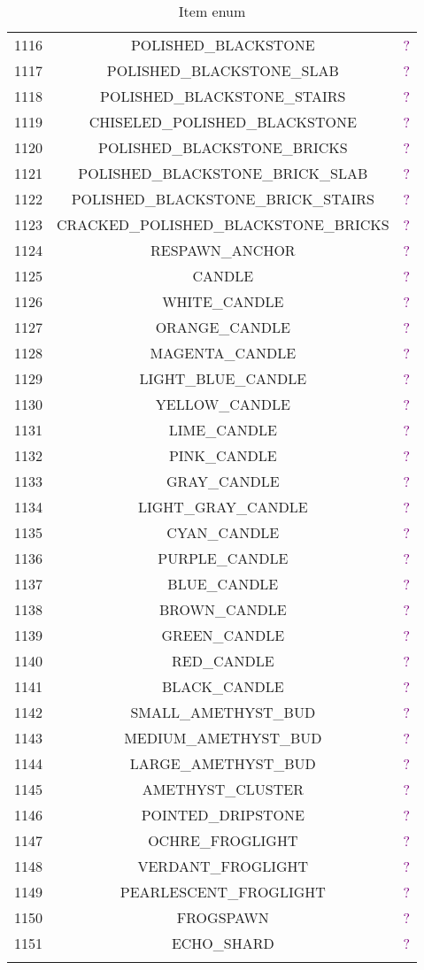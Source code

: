 \documentclass[11pt]{article}
\newcommand\myworries[1]{\textcolor{purple}{#1}}
\begin{document}
\begin{longtable}{ |c|c|c| }
	1116 & POLISHED\_BLACKSTONE & \myworries{?} \\
	1117 & POLISHED\_BLACKSTONE\_SLAB & \myworries{?} \\
	1118 & POLISHED\_BLACKSTONE\_STAIRS & \myworries{?} \\
	1119 & CHISELED\_POLISHED\_BLACKSTONE & \myworries{?} \\
	1120 & POLISHED\_BLACKSTONE\_BRICKS & \myworries{?} \\
	1121 & POLISHED\_BLACKSTONE\_BRICK\_SLAB & \myworries{?} \\
	1122 & POLISHED\_BLACKSTONE\_BRICK\_STAIRS & \myworries{?} \\
	1123 & CRACKED\_POLISHED\_BLACKSTONE\_BRICKS & \myworries{?} \\
	1124 & RESPAWN\_ANCHOR & \myworries{?} \\
	1125 & CANDLE & \myworries{?} \\
	1126 & WHITE\_CANDLE & \myworries{?} \\
	1127 & ORANGE\_CANDLE & \myworries{?} \\
	1128 & MAGENTA\_CANDLE & \myworries{?} \\
	1129 & LIGHT\_BLUE\_CANDLE & \myworries{?} \\
	1130 & YELLOW\_CANDLE & \myworries{?} \\
	1131 & LIME\_CANDLE & \myworries{?} \\
	1132 & PINK\_CANDLE & \myworries{?} \\
	1133 & GRAY\_CANDLE & \myworries{?} \\
	1134 & LIGHT\_GRAY\_CANDLE & \myworries{?} \\
	1135 & CYAN\_CANDLE & \myworries{?} \\
	1136 & PURPLE\_CANDLE & \myworries{?} \\
	1137 & BLUE\_CANDLE & \myworries{?} \\
	1138 & BROWN\_CANDLE & \myworries{?} \\
	1139 & GREEN\_CANDLE & \myworries{?} \\
	1140 & RED\_CANDLE & \myworries{?} \\
	1141 & BLACK\_CANDLE & \myworries{?} \\
	1142 & SMALL\_AMETHYST\_BUD & \myworries{?} \\
	1143 & MEDIUM\_AMETHYST\_BUD & \myworries{?} \\
	1144 & LARGE\_AMETHYST\_BUD & \myworries{?} \\
	1145 & AMETHYST\_CLUSTER & \myworries{?} \\
	1146 & POINTED\_DRIPSTONE & \myworries{?} \\
	1147 & OCHRE\_FROGLIGHT & \myworries{?} \\
	1148 & VERDANT\_FROGLIGHT & \myworries{?} \\
	1149 & PEARLESCENT\_FROGLIGHT & \myworries{?} \\
	1150 & FROGSPAWN & \myworries{?} \\
	1151 & ECHO\_SHARD & \myworries{?} \\
	\hline
	\caption{Item enum}
\end{longtable}
\end{document}
